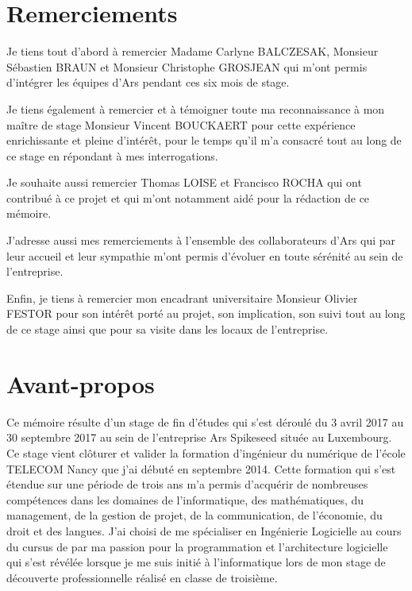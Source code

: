 \documentclass{tnreport}
\begin{document}
  
\maketitle
{}


\cleardoublepage

\makesecondtitle

\section*{Remerciements}

Je tiens tout d'abord à remercier Madame Carlyne BALCZESAK, Monsieur Sébastien BRAUN et Monsieur Christophe GROSJEAN qui m'ont permis d'intégrer les équipes d'Ar{\texteta}s pendant ces six mois de stage. 

Je tiens également à remercier et à témoigner toute ma reconnaissance à mon maître de stage Monsieur Vincent BOUCKAERT pour cette expérience enrichissante et pleine d’intérêt, pour le temps qu’il m'a consacré tout au long de ce stage en répondant à mes interrogations. 

Je souhaite aussi remercier Thomas LOISE et Francisco ROCHA qui ont contribué à ce projet et qui m'ont notamment aidé pour la rédaction de ce mémoire. 

J'adresse aussi mes remerciements à l'ensemble des collaborateurs d'Ar{\texteta}s qui par leur accueil et leur sympathie m'ont permis d'évoluer en toute sérénité au sein de l'entreprise. 

Enfin, je tiens à remercier mon encadrant universitaire Monsieur Olivier FESTOR pour son intérêt porté au projet, son implication, son suivi tout au long de ce stage ainsi que pour sa visite dans les locaux de l'entreprise.

\cleardoublepage

\section*{Avant-propos}

Ce mémoire résulte d'un stage de fin d'études qui s'est déroulé du 3 avril 2017 au 30 septembre 2017 au sein de l'entreprise Ar{\texteta}s Spikeseed située au Luxembourg. Ce stage vient clôturer et valider la formation d'ingénieur du numérique de l'école TELECOM Nancy que j'ai débuté en septembre 2014. Cette formation qui s'est étendue sur une période de trois ans m'a permis d'acquérir de nombreuses compétences dans les domaines de l'informatique, des mathématiques, du management, de la gestion de projet, de la communication, de l'économie, du droit et des langues. J'ai choisi de me spécialiser en Ingénierie Logicielle au cours du cursus de par ma passion pour la programmation et l'architecture logicielle qui s'est révélée lorsque je me suis initié à l'informatique lors de mon stage de découverte professionnelle réalisé en classe de troisième.
\end{document}
